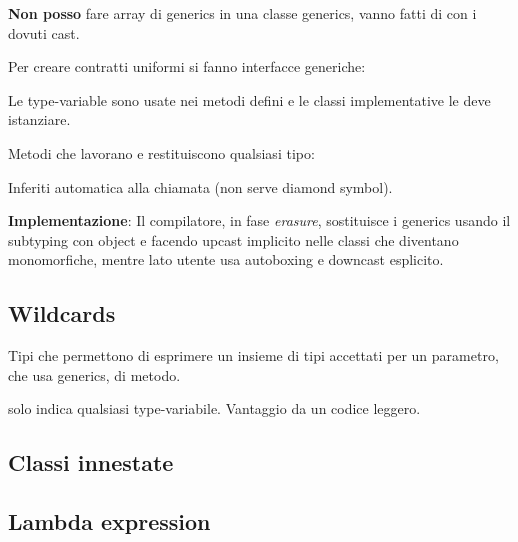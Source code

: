 \textbf{Non posso} fare array di generics in una classe generics, vanno fatti di  con i dovuti cast.

\bigskip

Per creare contratti uniformi si fanno interfacce generiche:


Le type-variable sono usate nei metodi defini e le classi implementative le deve istanziare.

\bigskip

Metodi che lavorano e restituiscono qualsiasi tipo:



Inferiti automatica alla chiamata (non serve diamond symbol).

\bigskip

\textbf{Implementazione}: Il compilatore, in fase \textit{erasure}, sostituisce i generics usando il subtyping con object e facendo upcast implicito nelle classi che diventano monomorfiche, mentre lato utente usa autoboxing e downcast esplicito.

\subsection{Wildcards}
Tipi che permettono di esprimere un insieme di tipi accettati per un parametro, che usa generics, di metodo.


solo  indica qualsiasi type-variabile. Vantaggio da un codice leggero.

\subsection{Classi innestate}

\subsection{Lambda expression}

